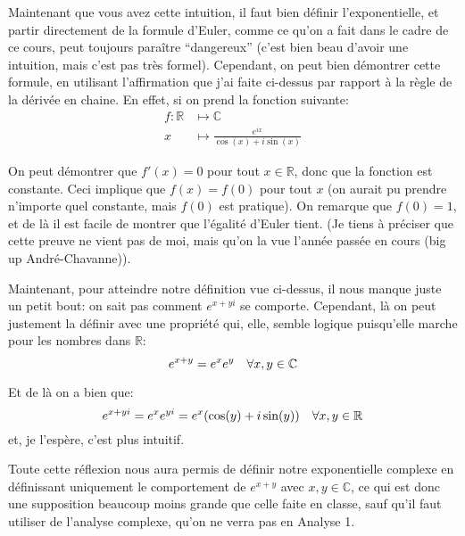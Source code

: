 \documentclass{article}
\begin{document}
{{        Maintenant que vous avez cette intuition, il faut bien définir l'exponentielle, et partir directement de la formule d'Euler, comme ce qu'on a fait dans le cadre de ce cours, peut toujours paraître ``dangereux'' (c'est bien beau d'avoir une intuition, mais c'est pas très formel). Cependant, on peut bien démontrer cette formule, en utilisant l'affirmation que j'ai faite ci-dessus par rapport à la règle de la dérivée en chaine. En effet, si on prend la fonction suivante:
        \[\begin{split}
        f: \mathbb{R} &\longmapsto \mathbb{C} \\
        x &\longmapsto \frac{e^{ix}}{\cos\left(x\right) + i\sin\left(x\right)}
        \end{split}\]

        On peut démontrer que $f'\left(x\right) = 0$ pour tout $x \in \mathbb{R}$, donc que la fonction est constante. Ceci implique que $f\left(x\right) = f\left(0\right)$ pour tout $x$ (on aurait pu prendre n'importe quel constante, mais $f\left(0\right)$ est pratique). On remarque que $f\left(0\right) = 1$, et de là il est facile de montrer que l'égalité d'Euler tient. (Je tiens à préciser que cette preuve ne vient pas de moi, mais qu'on la vue l'année passée en cours (big up André-Chavanne)).

        Maintenant, pour atteindre notre définition vue ci-dessus, il nous manque juste un petit bout: on sait pas comment $e^{x + yi}$ se comporte. Cependant, là on peut justement la définir avec une propriété qui, elle, semble logique puisqu'elle marche pour les nombres dans $\mathbb{R}$:
        \[e^{x + y} = e^{x} e^{y} \quad \forall x, y \in \mathbb{C}\]

        Et de là on a bien que:
        \[e^{x + yi} = e^{x} e^{yi} = e^{x} \left(\cos\left(y\right) + i\sin\left(y\right)\right) \mathspace \forall x, y \in \mathbb{R}\]
        et, je l'espère, c'est plus intuitif.

        Toute cette réflexion nous aura permis de définir notre exponentielle complexe en définissant uniquement le comportement de $e^{x + y}$ avec $x, y \in \mathbb{C}$, ce qui est donc une supposition beaucoup moins grande que celle faite en classe, sauf qu'il faut utiliser de l'analyse complexe, qu'on ne verra pas en Analyse 1.
    }
}

\end{document}

